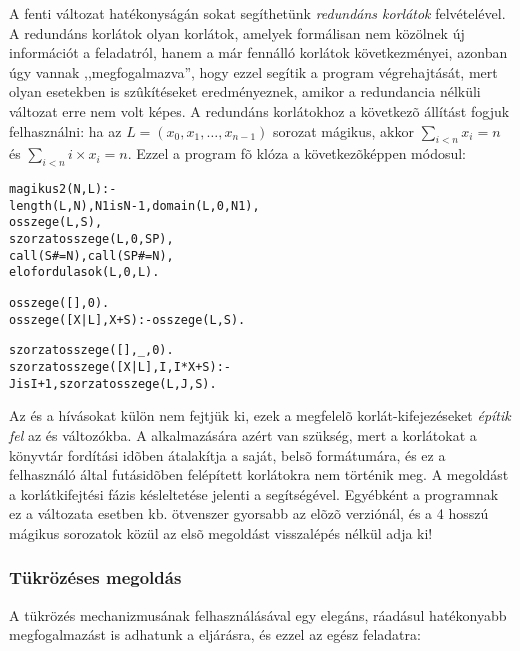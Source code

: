 A fenti változat hatékonyságán sokat segíthetünk \emph{redundáns korlátok}
felvételével. A redundáns korlátok olyan korlátok, amelyek formálisan nem
közölnek új információt a feladatról, hanem a már fennálló korlátok következményei,
azonban úgy vannak ,,megfogalmazva'', hogy ezzel segítik a program végrehajtását,
mert olyan esetekben is szûkítéseket eredményeznek, amikor a redundancia nélküli
változat erre nem volt képes. A redundáns korlátokhoz a következõ állítást
fogjuk felhasználni:
\br
\tetel ha az $L = (x_{0}, x_{1}, \ldots, x_{n-1})$ sorozat mágikus,
akkor $\sum_{i<n} x_{i} = n$ és $\sum_{i<n} i \times x_{i} = n$.
\br
Ezzel a program fõ klóza a következõképpen módosul:
\begin{alltt}
% Az L lista egy N hosszú mágikus sorozat
magikus2(N, L) :-
    length(L, N), N1 is N-1, domain(L, 0, N1),
    osszege(L, S),               % \(\sum_{i\in [1..\cd{N}]} L_{i} = \cd{S}\)
    szorzatosszege(L, 0, SP),    % \(\sum_{i\in [1..\cd{N}]} i*L_{i} = \cd{SP}\)
    call(S #= N), call(SP #= N), % lásd a megjegyzést
    elofordulasok(L, 0, L).      % lásd az elõzõ lapon

% osszege(L, Ossz): Ossz = \(\sum_i \cd{L}_i\)
osszege([], 0).
osszege([X|L], X+S) :- osszege(L, S).

% szorzatosszege(L, I, Ossz): Ossz = \(\cd{I}*\cd{L}_1+\cd{(I+1)}*\cd{L}_2+\ldots\)
szorzatosszege([], _, 0).
szorzatosszege([X|L], I, I*X+S) :- 
    J is I+1, szorzatosszege(L, J, S).
\end{alltt}

Az  és a  hívásokat külön nem fejtjük ki, ezek
a megfelelõ korlát-kifejezéseket \emph{építik fel} az  és  változókba.
A  alkalmazására azért van szükség, mert a korlátokat a \clpfd könyvtár
fordítási idõben átalakítja a saját, belsõ formátumára, és ez a felhasználó által
futásidõben felépített korlátokra nem történik meg. A megoldást a korlátkifejtési
fázis késleltetése jelenti a  segítségével. Egyébként a programnak ez a
változata  esetben kb. ötvenszer gyorsabb az elõzõ verziónál, és a 4 hosszú
mágikus sorozatok közül az elsõ megoldást visszalépés nélkül adja ki!

\subsubsection{Tükrözéses megoldás}

A tükrözés mechanizmusának felhasználásával egy elegáns, ráadásul hatékonyabb
megfogalmazást is adhatunk a  eljárásra, és ezzel az egész
feladatra:

